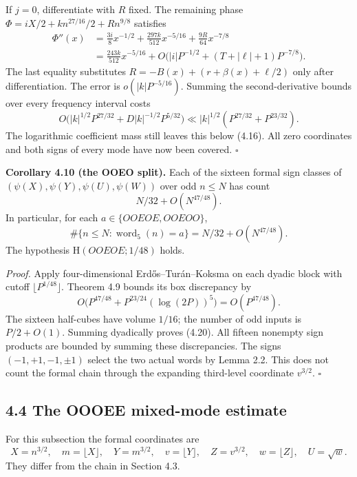 \documentclass[11pt,a4paper]{article}
\begin{document}
If \(j=0\), differentiate with \(R\) fixed. The remaining phase
\(\Phi=iX/2+kn^{27/16}/2+Rn^{9/8}\) satisfies \[
\begin{split}
\Phi''(x)&=\tfrac{3i}{8}x^{-1/2}
+\tfrac{297k}{512}x^{-5/16}
+\tfrac{9R}{64}x^{-7/8}\\
&=\tfrac{243k}{512}x^{-5/16}
+O\bigl(|i|P^{-1/2}+(T+|\ell|+1)P^{-7/8}\bigr).
\end{split}
\] The last equality substitutes \(R=-B(x)+(r+\beta(x)+\ell/2)\) only
after differentiation. The error is \(o(|k|P^{-5/16})\). Summing the
second-derivative bounds over every frequency interval costs \[
O\bigl(|k|^{1/2}P^{27/32}
+D|k|^{-1/2}P^{5/32}\bigr)
\ll |k|^{1/2}(P^{27/32}+P^{23/32}).
\] The logarithmic coefficient mass still leaves this below (4.16). All
zero coordinates and both signs of every mode have now been covered.
\(\square\)


\textbf{Corollary 4.10 (the OOEO split).} Each of the sixteen formal
sign classes of \((\psi(X),\psi(Y),\psi(U),\psi(W))\) over odd
\(n\le N\) has count \[
N/32+O(N^{47/48}).
\tag{4.20}
\] In particular, for each \(a\in\{OOEOE,OOEOO\}\), \[
\#\{n\le N:\operatorname{word}_5(n)=a\}
=N/32+O(N^{47/48}).
\] The hypothesis \(\mathrm H(OOEOE;1/48)\) holds.

\emph{Proof.} Apply four-dimensional Erd\H{o}s--Tur\'{a}n--Koksma on
each dyadic block with cutoff \(\lfloor P^{1/48}\rfloor\). Theorem 4.9
bounds its box discrepancy by \[
O\bigl(P^{47/48}+P^{23/24}(\log(2P))^5\bigr)
=O(P^{47/48}).
\] The sixteen half-cubes have volume \(1/16\); the number of odd inputs
is \(P/2+O(1)\). Summing dyadically proves (4.20). All fifteen nonempty
sign products are bounded by summing these discrepancies. The signs
\((-1,+1,-1,\pm1)\) select the two actual words by Lemma 2.2. This does
not count the formal chain through the expanding third-level coordinate
\(v^{3/2}\). \(\square\)

\subsection{4.4 The OOOEE mixed-mode
estimate}\label{the-oooee-mixed-mode-estimate}

For this subsection the formal coordinates are \[
X=n^{3/2},\quad m=\lfloor X\rfloor,\quad Y=m^{3/2},\quad
v=\lfloor Y\rfloor,\quad Z=v^{3/2},\quad w=\lfloor Z\rfloor,\quad U=\sqrt w.
\] They differ from the chain in Section 4.3.

\end{document}
